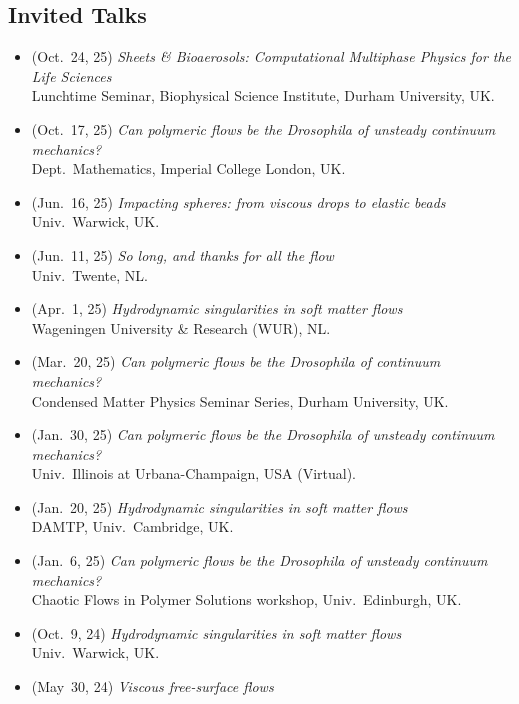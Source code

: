 \subsection{\faMicrophone\hspace{0.3em}Invited Talks}
\begin{itemize}[leftmargin=1.5em]
\item[\textbullet] (Oct.~24, 25) \emph{Sheets \& Bioaerosols: Computational Multiphase Physics for the Life Sciences} \\
  Lunchtime Seminar, Biophysical Science Institute, Durham University, UK.
\item[\textbullet] (Oct.~17, 25) \emph{Can polymeric flows be the Drosophila of unsteady continuum mechanics?} \\
  Dept.~Mathematics, Imperial College London, UK.
\item[\textbullet] (Jun.~16, 25) \emph{Impacting spheres: from viscous drops to elastic beads} \\
  Univ.~Warwick, UK.
\item[\textbullet] (Jun.~11, 25) \emph{So long, and thanks for all the flow} \\
  Univ.~Twente, NL.
\item[\textbullet] (Apr.~1, 25) \emph{Hydrodynamic singularities in soft matter flows} \\
  Wageningen University \& Research (WUR), NL.
\item[\textbullet] (Mar.~20, 25) \emph{Can polymeric flows be the Drosophila of continuum mechanics?} \\
  Condensed Matter Physics Seminar Series, Durham University, UK.
\item[\textbullet] (Jan.~30, 25) \emph{Can polymeric flows be the Drosophila of unsteady continuum mechanics?} \\
  Univ.~Illinois at Urbana-Champaign, USA (Virtual).
\item[\textbullet] (Jan.~20, 25) \emph{Hydrodynamic singularities in soft matter flows} \\
  DAMTP, Univ.~Cambridge, UK.
\item[\textbullet] (Jan.~6, 25) \emph{Can polymeric flows be the Drosophila of unsteady continuum mechanics?} \\
  Chaotic Flows in Polymer Solutions workshop, Univ.~Edinburgh, UK.
\item[\textbullet] (Oct.~9, 24) \emph{Hydrodynamic singularities in soft matter flows} \\
  Univ.~Warwick, UK.
\item[\textbullet] (May~30, 24) \emph{Viscous free-surface flows} \\

\end{itemize}
